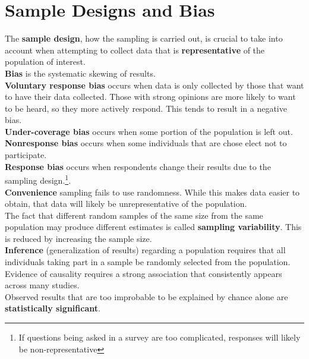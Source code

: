 \documentclass[../AP_Statistics.tex]{subfiles}
\begin{document}
		\section*{Sample Designs and Bias}
		The \textbf{sample design}, how the sampling is carried out, is crucial to take into account when attempting to collect data that is \textbf{representative} of the population of interest. \\
		\textbf{Bias} is the systematic skewing of results. \\
		\textbf{Voluntary response bias} occurs when data is only collected by those that want to have their data collected. Those with strong opinions are more likely to want to be heard, so they more actively respond. This tends to result in a negative bias. \\
		\textbf{Under-coverage bias} occurs when some portion of the population is left out. \\
		\textbf{Nonresponse bias} occurs when some individuals that are chose elect not to participate. \\
		\textbf{Response bias} occurs when respondents change their results due to the sampling design.\footnote{If questions being asked in a survey are too complicated, responses will likely be non-representative}. \\
		\textbf{Convenience} sampling fails to use randomness. While this makes data easier to obtain, that data will likely be unrepresentative of the population. \\
		The fact that different random samples of the same size from the same population may produce different estimates is called \textbf{sampling variability}. This is reduced by increasing the sample size. \\
		\textbf{Inference} (generalization of results) regarding a population requires that all individuals taking part in a sample be randomly selected from the population. \\
		Evidence of causality requires a strong association that consistently appears across many studies. \\
		Observed results that are too improbable to be explained by chance alone are \textbf{statistically significant}.
\end{document}
